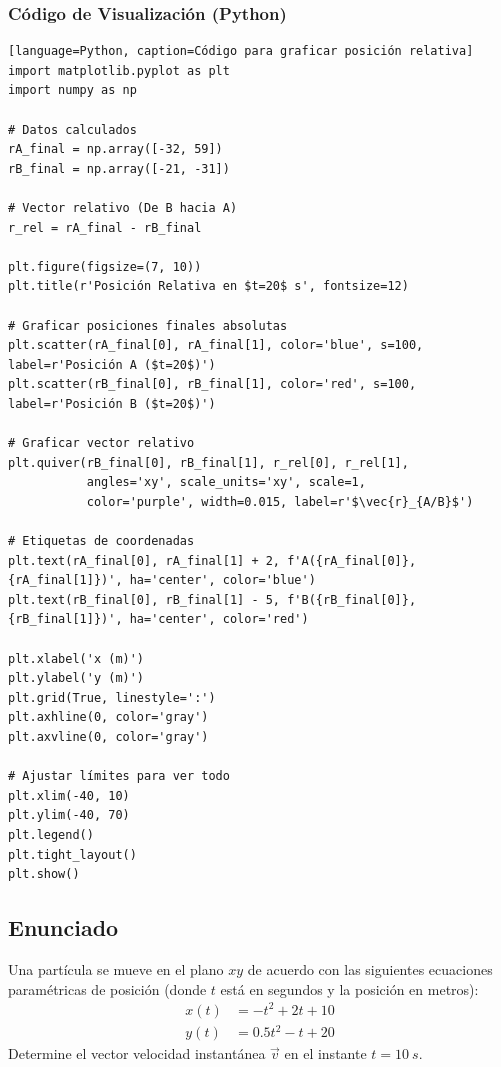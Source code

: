 \documentclass[12pt, a4paper]{article}
\begin{document}
\subsubsection*{Código de Visualización (Python)}
\begin{verbatim}[language=Python, caption=Código para graficar posición relativa]
import matplotlib.pyplot as plt
import numpy as np

# Datos calculados
rA_final = np.array([-32, 59])
rB_final = np.array([-21, -31])

# Vector relativo (De B hacia A)
r_rel = rA_final - rB_final

plt.figure(figsize=(7, 10))
plt.title(r'Posición Relativa en $t=20$ s', fontsize=12)

# Graficar posiciones finales absolutas
plt.scatter(rA_final[0], rA_final[1], color='blue', s=100, label=r'Posición A ($t=20$)')
plt.scatter(rB_final[0], rB_final[1], color='red', s=100, label=r'Posición B ($t=20$)')

# Graficar vector relativo
plt.quiver(rB_final[0], rB_final[1], r_rel[0], r_rel[1], 
           angles='xy', scale_units='xy', scale=1, 
           color='purple', width=0.015, label=r'$\vec{r}_{A/B}$')

# Etiquetas de coordenadas
plt.text(rA_final[0], rA_final[1] + 2, f'A({rA_final[0]}, {rA_final[1]})', ha='center', color='blue')
plt.text(rB_final[0], rB_final[1] - 5, f'B({rB_final[0]}, {rB_final[1]})', ha='center', color='red')

plt.xlabel('x (m)')
plt.ylabel('y (m)')
plt.grid(True, linestyle=':')
plt.axhline(0, color='gray')
plt.axvline(0, color='gray')

# Ajustar límites para ver todo
plt.xlim(-40, 10)
plt.ylim(-40, 70)
plt.legend()
plt.tight_layout()
plt.show()
\end{verbatim}

\newpage

\subsection*{Enunciado}
Una partícula se mueve en el plano $xy$ de acuerdo con las siguientes ecuaciones paramétricas de posición (donde $t$ está en segundos y la posición en metros):
\begin{align*}
    x(t) &= -t^2 + 2t + 10 \\
    y(t) &= 0.5t^2 - t + 20
\end{align*}
Determine el vector velocidad instantánea $\vec{v}$ en el instante $t = \SI{10}{s}$.
\end{document}
